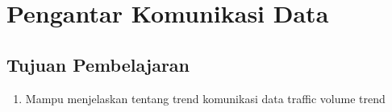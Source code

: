 \chapter{Pengantar Komunikasi Data}

\section{Tujuan Pembelajaran}

\begin{enumerate}
	\item Mampu menjelaskan tentang trend komunikasi data traffic volume trend
	
\end{enumerate}

